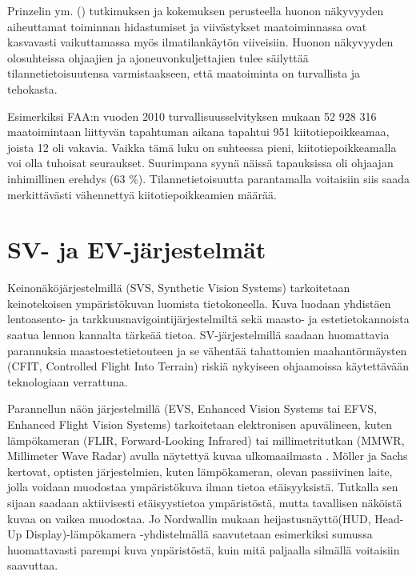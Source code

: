 \documentclass[utf8,bachelor,manualbib]{gradu3}
\begin{document}
Prinzelin ym. (\citeyear{prinzel2013}) tutkimuksen ja kokemuksen perusteella huonon näkyvyyden aiheuttamat toiminnan hidastumiset ja viivästykset maatoiminnassa ovat kasvavasti vaikuttamassa myös ilmatilankäytön viiveisiin. Huonon näkyvyyden olosuhteissa ohjaajien ja ajoneuvonkuljettajien tulee säilyttää tilannetietoisuutensa varmistaakseen, että maatoiminta on turvallista ja tehokasta.

Esimerkiksi FAA:n vuoden 2010 turvallisuusselvityksen mukaan 52 928 316 maatoimintaan liittyvän tapahtuman aikana tapahtui 951 kiitotiepoikkeamaa, joista 12 oli vakavia. Vaikka tämä luku on suhteessa pieni, kiitotiepoikkeamalla voi olla tuhoisat seuraukset. Suurimpana syynä näissä tapauksissa oli ohjaajan inhimillinen erehdys (63 \%). Tilannetietoisuutta parantamalla voitaisiin siis saada merkittävästi vähennettyä kiitotiepoikkeamien määrää. \citep{prinzel2013}


\chapter{SV- ja EV-järjestelmät}

Keinonäköjärjestelmillä (SVS, Synthetic Vision Systems) tarkoitetaan keinotekoisen ympäristökuvan luomista tietokoneella. Kuva luodaan yhdistäen lentoasento- ja tarkkuusnavigointijärjestelmiltä sekä maasto- ja estetietokannoista saatua lennon kannalta tärkeää tietoa. SV-järjestelmillä saadaan huomattavia parannuksia maastoestetietouteen ja se vähentää tahattomien maahantörmäysten (CFIT, Controlled Flight Into Terrain) riskiä nykyiseen ohjaamoissa käytettävään teknologiaan verrattuna. \citep{baileyym2007}

Parannellun näön järjestelmillä (EVS, Enhanced Vision Systems tai EFVS, Enhanced Flight Vision Systems) tarkoitetaan elektronisen apuvälineen, kuten lämpökameran (FLIR, Forward-Looking Infrared) tai millimetritutkan (MMWR, Millimeter Wave Radar) avulla näytettyä kuvaa ulkomaailmasta \citep{baileyym2007}. Möller ja Sachs \citeyearpar{mollersachs1994} kertovat, optisten järjestelmien, kuten lämpökameran, olevan passiivinen laite, jolla voidaan muodostaa ympäristökuva ilman tietoa etäisyyksistä. Tutkalla sen sijaan saadaan aktiivisesti etäisyystietoa ympäristöstä, mutta tavallisen näköistä kuvaa on vaikea muodostaa.  Jo Nordwallin \citeyearpar{nordwall1993} mukaan heijastusnäyttö(HUD, Head-Up Display)-lämpökamera -yhdistelmällä saavutetaan esimerkiksi sumussa huomattavasti parempi kuva ynpäristöstä, kuin mitä paljaalla silmällä voitaisiin saavuttaa. 
\end{document}
